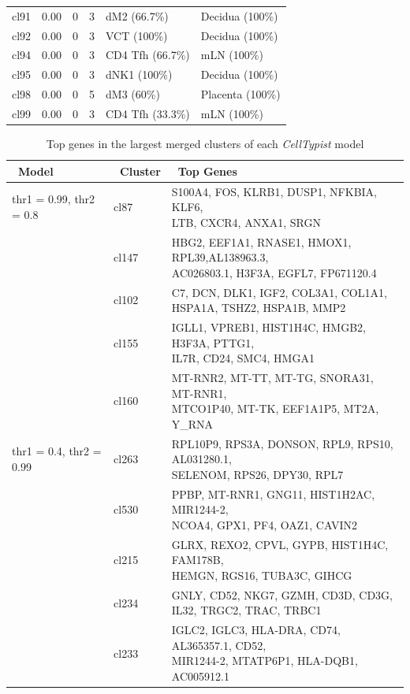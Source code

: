 \begin{table}[ht!]
\begin{tabular}{lrrrll}
  cl91 & 0.00 &   0 &   3 & dM2 (66.7\%) & Decidua (100\%) \\ 
  cl92 & 0.00 &   0 &   3 & VCT (100\%) & Decidua (100\%) \\ 
  cl94 & 0.00 &   0 &   3 & CD4 Tfh (66.7\%) & mLN (100\%) \\ 
  cl95 & 0.00 &   0 &   3 & dNK1 (100\%) & Decidua (100\%) \\ 
  cl98 & 0.00 &   0 &   5 & dM3 (60\%) & Placenta (100\%) \\ 
  cl99 & 0.00 &   0 &   3 & CD4 Tfh (33.3\%) & mLN (100\%) \\ 
   \bottomrule
\end{tabular}
\end{table}


\begin{table}[ht!] %
\footnotesize
\caption[Top genes in the largest merged clusters of each \textit{CellTypist} model]{Top genes in the largest merged clusters of each \textit{CellTypist} model}
\centering
\label{table:tab_appB_clgenes}

\begin{tabular}{l|l|l}
\toprule
~\textbf{Model} & ~\textbf{Cluster} & ~\textbf{Top Genes} \\
\midrule
thr1 = 0.99, thr2 = 0.8 & cl87 & \specialcell[t]{S100A4, FOS, KLRB1, DUSP1, NFKBIA, KLF6,\\LTB, CXCR4, ANXA1, SRGN} \\
 & cl147 & \specialcell[t]{HBG2, EEF1A1, RNASE1, HMOX1, RPL39,AL138963.3,\\AC026803.1, H3F3A, EGFL7, FP671120.4}  \\
 & cl102 & \specialcell[t]{C7, DCN, DLK1, IGF2, COL3A1, COL1A1,\\HSPA1A, TSHZ2, HSPA1B, MMP2} \\
 & cl155 & \specialcell[t]{IGLL1, VPREB1, HIST1H4C, HMGB2, H3F3A, PTTG1,\\IL7R, CD24, SMC4, HMGA1} \\
 & cl160 & \specialcell[t]{MT-RNR2, MT-TT, MT-TG, SNORA31, MT-RNR1,\\MTCO1P40, MT-TK, EEF1A1P5, MT2A, Y\_RNA} \\
 
\midrule
thr1 = 0.4, thr2 = 0.99 & cl263 & \specialcell[t]{RPL10P9, RPS3A, DONSON, RPL9, RPS10, AL031280.1,\\SELENOM, RPS26, DPY30, RPL7}  \\
 & cl530 & \specialcell[t]{PPBP, MT-RNR1, GNG11, HIST1H2AC, MIR1244-2,\\NCOA4, GPX1, PF4, OAZ1, CAVIN2}  \\
 & cl215 & \specialcell[t]{GLRX, REXO2, CPVL, GYPB, HIST1H4C, FAM178B,\\HEMGN, RGS16, TUBA3C, GIHCG}  \\
 & cl234 & \specialcell[t]{GNLY, CD52, NKG7, GZMH, CD3D, CD3G,\\IL32, TRGC2, TRAC, TRBC1}  \\
 & cl233 & \specialcell[t]{IGLC2, IGLC3, HLA-DRA, CD74, AL365357.1, CD52,\\ MIR1244-2, MTATP6P1, HLA-DQB1, AC005912.1}  \\
 

\end{tabular}
\end{table}
